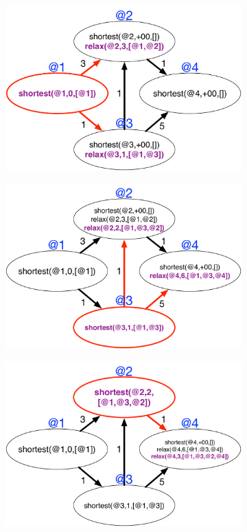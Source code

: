 \begin{figure}
\begin{center}
   \begin{subfigure}[b]{0.49\textwidth}
      \includegraphics[width=\textwidth]{figures/sssp/coord1}
      \caption{}
   \end{subfigure}
   \begin{subfigure}[b]{0.49\textwidth}
      \includegraphics[width=\textwidth]{figures/sssp/coord2}
      \caption{}
   \end{subfigure}
   \begin{subfigure}[b]{0.49\textwidth}
      \includegraphics[width=\textwidth]{figures/sssp/coord3}

\end{subfigure}
\end{center}
\end{figure}
